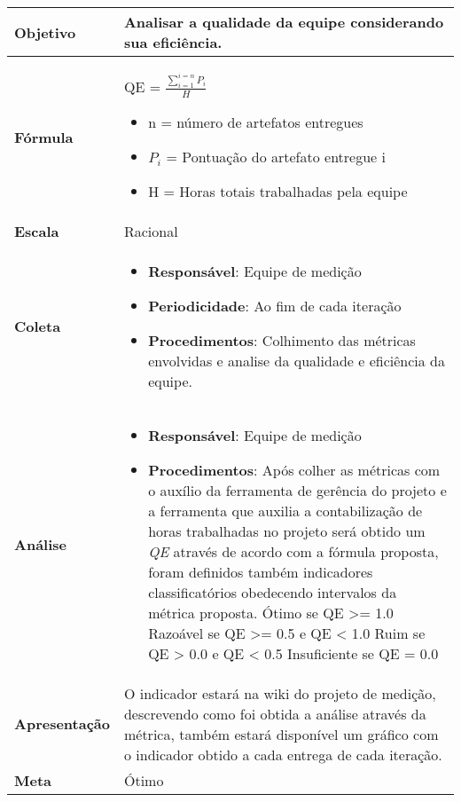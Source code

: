 	\begin{tabular}{ |p{3cm}|p{12cm}| }
		\hline
		\textbf{Objetivo} & Analisar a qualidade da equipe considerando sua eficiência. \\
		\hline
		\textbf{Fórmula} & QE = $\frac{\sum_{i=1}^{i=n}P_i}{H}$ \begin{itemize}
  		\item n = número de artefatos entregues 
	  	\item $P_i$ = Pontuação do artefato entregue i
		  \item H = Horas totais trabalhadas pela equipe
		  \end{itemize}\\
		\hline
		\textbf{Escala} & Racional \\
		\hline
    	\textbf{Coleta} & \begin{itemize}
		 \item \textbf{Responsável}: Equipe de medição
    	 \item \textbf{Periodicidade}: Ao fim de cada iteração
                                                                                                                                \item \textbf{Procedimentos}: Colhimento das métricas envolvidas e analise da qualidade e eficiência da equipe.
		\end{itemize} \\
		\hline
		\textbf{Análise} & \begin{itemize}
			\item \textbf{Responsável}: Equipe de medição
			\item \textbf{Procedimentos}: Após colher as métricas com o auxílio da ferramenta de gerência do projeto e a ferramenta que auxilia a contabilização de horas trabalhadas no projeto será obtido um \textit{QE} através de acordo com a fórmula proposta, foram definidos também indicadores classificatórios obedecendo intervalos da métrica proposta.
				\subitem Ótimo se QE >= 1.0
				\subitem Razoável se QE >= 0.5 e QE < 1.0
				\subitem Ruim se QE > 0.0 e QE < 0.5
				\subitem Insuficiente se QE = 0.0
		\end{itemize} \\
		\hline
		\textbf{Apresentação} & O indicador estará na wiki do projeto de medição, descrevendo como foi obtida a análise através da métrica, também estará disponível um gráfico com o indicador obtido a cada entrega de cada iteração. \\
		\hline
		\textbf{Meta} & Ótimo \\
		\hline
	\end{tabular}

